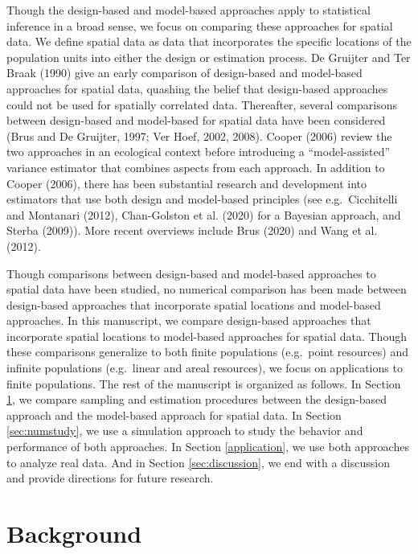 \documentclass[]{elsarticle} %
\begin{document}
Though the design-based and model-based approaches apply to statistical
inference in a broad sense, we focus on comparing these approaches for
spatial data. We define spatial data as data that incorporates the
specific locations of the population units into either the design or
estimation process. De Gruijter and Ter Braak (1990) give an early
comparison of design-based and model-based approaches for spatial data,
quashing the belief that design-based approaches could not be used for
spatially correlated data. Thereafter, several comparisons between
design-based and model-based for spatial data have been considered (Brus
and De Gruijter, 1997; Ver Hoef, 2002, 2008). Cooper (2006) review the
two approaches in an ecological context before introducing a
``model-assisted'' variance estimator that combines aspects from each
approach. In addition to Cooper (2006), there has been substantial
research and development into estimators that use both design and
model-based principles (see e.g.~Cicchitelli and Montanari (2012),
Chan-Golston et al. (2020) for a Bayesian approach, and Sterba (2009)).
More recent overviews include Brus (2020) and Wang et al. (2012).

Though comparisons between design-based and model-based approaches to
spatial data have been studied, no numerical comparison has been made
between design-based approaches that incorporate spatial locations and
model-based approaches. In this manuscript, we compare design-based
approaches that incorporate spatial locations to model-based approaches
for spatial data. Though these comparisons generalize to both finite
populations (e.g.~point resources) and infinite populations (e.g.~linear
and areal resources), we focus on applications to finite populations.
The rest of the manuscript is organized as follows. In Section
\ref{sec:background}, we compare sampling and estimation procedures
between the design-based approach and the model-based approach for
spatial data. In Section \ref{sec:numstudy}, we use a simulation
approach to study the behavior and performance of both approaches. In
Section \ref{application}, we use both approaches to analyze real data.
And in Section \ref{sec:discussion}, we end with a discussion and
provide directions for future research.

\hypertarget{sec:background}{%
\section{Background}\label{sec:background}}
\end{document}
